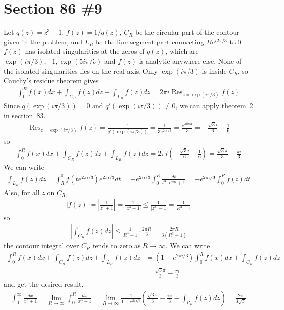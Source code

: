 \documentclass{scrartcl}
\DeclareMathOperator*{\Res}{Res}
\begin{document}
\section{Section 86 \#9}
Let \(q(z) = z^3 + 1,\, f(z) = 1 / q(z)\), \(C_R\) be the circular part of the contour given in the problem, and \(L_R\) be the line segment part connecting \(Re^{i2\pi / 3}\) to 0.
\(f(z)\) has isolated singularities at the zeros of \(q(z)\), which are \(\exp(i\pi / 3), -1, \exp(5i\pi / 3)\) and \(f(z)\) is analytic anywhere else.
None of the isolated singularities lies on the real axis.
Only \(\exp(i\pi / 3)\) is inside \(C_R\), so Cauchy's residue theorem gives
\begin{align*}
  \int^R_0 f(x) dx + \int_{C_R} f(z) dz + \int_{L_R} f(z) dz = 2\pi i \Res_{z = \exp(i\pi / 3)} f(z)
\end{align*}
Since \(q(\exp(i\pi / 3)) = 0\) and \(q'(\exp(i\pi / 3)) \not = 0\), we can apply theorem~2 in section~83.
\begin{align*}
  \Res_{z = \exp(i\pi / 3)} f(z) = \frac{1}{q'(\exp(i\pi / 3))} = \frac{1}{3e^{2i\pi / 3}} = \frac{e^{4i\pi / 3}}{3} = -\frac{\sqrt{3}i}{6} - \frac{1}{6}
\end{align*}
so
\begin{align*}
  \int^R_0 f(x) dx + \int_{C_R} f(z) dz + \int_{L_R} f(z) dz
  = 2\pi i \left( -\frac{\sqrt{3}i}{6} - \frac{1}{6} \right)
  = \frac{\sqrt{3}\pi}{3} - \frac{\pi i}{3}
\end{align*}
We can write
\begin{align*}
  \int_{L_R} f(z) dz
  = \int^0_R f(te^{2\pi i / 3}) e^{2\pi i / 3} dt
  = -e^{2\pi i / 3} \int^R_0 \frac{dt}{t^3 \cdot e^{2\pi i} + 1}
  = -e^{2\pi i / 3} \int^R_0 f(t) dt
\end{align*}
Also, for all \(z\) on \(C_R\),
\begin{align*}
  |f(z)| = \left| \frac{1}{z^3 + 1} \right| = \frac{1}{|z^3 + 1|} \leq \frac{1}{|z^3| - 1} = \frac{1}{R^3 - 1}
\end{align*}
so
\begin{align*}
  \left| \int_{C_R} f(z) dz \right| \leq \frac{1}{R^3 - 1} \cdot \frac{2\pi R}{3} = \frac{2\pi R}{3(R^3 - 1)}
\end{align*}
the contour integral over \(C_R\) tends to zero as \(R \to \infty\).
We can write
\begin{align*}
  \int^R_0 f(x) dx + \int_{C_R} f(z) dz + \int_{L_R} f(z) dz
  &= (1 - e^{2\pi i / 3}) \int^R_0 f(x) dx + \int_{C_R} f(z) dz \\
  &= \frac{\sqrt{3}\pi}{3} - \frac{\pi i}{3}
\end{align*}
and get the desired result.
\begin{align*}
  \int^\infty_0 \frac{dx}{x^3 + 1}
  = \lim_{R \to \infty} \int^R_0 \frac{dx}{x^3 + 1}
  = \lim_{R \to \infty} \frac{1}{1 - e^{2\pi i / 3}} \left( \frac{\sqrt{3}\pi}{3} - \frac{\pi i}{3} - \int_{C_R} f(z) dz \right)
  = \frac{2\pi}{3\sqrt{3}}
\end{align*}
\end{document}
